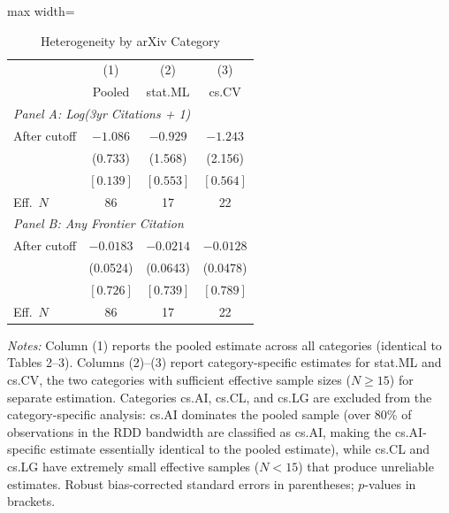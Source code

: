 \begin{table}[htbp]
\centering
\caption{Heterogeneity by arXiv Category}
\label{tab:heterogeneity}
\begin{adjustbox}{max width=\textwidth}
\begin{tabular}{lccc}
\hline\hline
& (1) & (2) & (3) \\
& Pooled & stat.ML & cs.CV \\
\hline
\multicolumn{4}{l}{\textit{Panel A: Log(3yr Citations + 1)}} \\
After cutoff & $-1.086$ & $-0.929$ & $-1.243$ \\
& (0.733) & (1.568) & (2.156) \\
& $[0.139]$ & $[0.553]$ & $[0.564]$ \\
Eff.\ $N$ & 86 & 17 & 22 \\
\hline
\multicolumn{4}{l}{\textit{Panel B: Any Frontier Citation}} \\
After cutoff & $-0.0183$ & $-0.0214$ & $-0.0128$ \\
& (0.0524) & (0.0643) & (0.0478) \\
& $[0.726]$ & $[0.739]$ & $[0.789]$ \\
Eff.\ $N$ & 86 & 17 & 22 \\
\hline\hline
\end{tabular}
\end{adjustbox}
\begin{minipage}{0.95\textwidth}
\footnotesize
\textit{Notes:} Column (1) reports the pooled estimate across all categories (identical to Tables 2--3). Columns (2)--(3) report category-specific estimates for stat.ML and cs.CV, the two categories with sufficient effective sample sizes ($N \geq 15$) for separate estimation. Categories cs.AI, cs.CL, and cs.LG are excluded from the category-specific analysis: cs.AI dominates the pooled sample (over 80\% of observations in the RDD bandwidth are classified as cs.AI, making the cs.AI-specific estimate essentially identical to the pooled estimate), while cs.CL and cs.LG have extremely small effective samples ($N < 15$) that produce unreliable estimates. Robust bias-corrected standard errors in parentheses; $p$-values in brackets.
\end{minipage}
\end{table}
